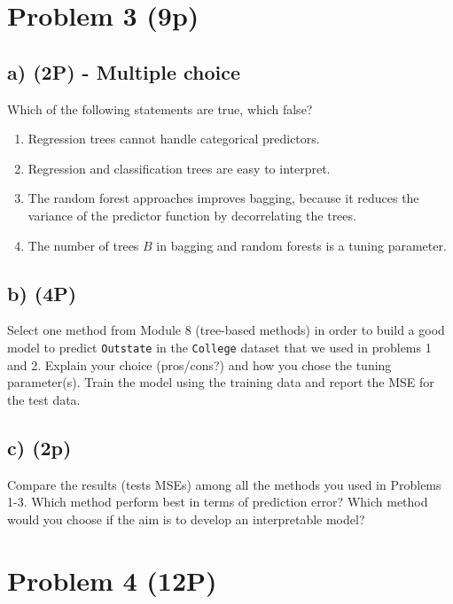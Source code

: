 \documentclass[]{article}
\providecommand{\tightlist}{%
  \setlength{\itemsep}{0pt}\setlength{\parskip}{0pt}}
\begin{document}
\hypertarget{problem-3-9p}{%
\section{Problem 3 (9p)}\label{problem-3-9p}}

\hypertarget{a-2p---multiple-choice-1}{%
\subsection{a) (2P) - Multiple choice}\label{a-2p---multiple-choice-1}}

Which of the following statements are true, which false?

\begin{enumerate}
\def\labelenumi{(\roman{enumi})}
\tightlist
\item
  Regression trees cannot handle categorical predictors.
\item
  Regression and classification trees are easy to interpret.
\item
  The random forest approaches improves bagging, because it reduces the
  variance of the predictor function by decorrelating the trees.
\item
  The number of trees \(B\) in bagging and random forests is a tuning
  parameter.
\end{enumerate}

\hypertarget{b-4p}{%
\subsection{b) (4P)}\label{b-4p}}

Select one method from Module 8 (tree-based methods) in order to build a
good model to predict \texttt{Outstate} in the \texttt{College} dataset
that we used in problems 1 and 2. Explain your choice (pros/cons?) and
how you chose the tuning parameter(s). Train the model using the
training data and report the MSE for the test data.

\hypertarget{c-2p-1}{%
\subsection{c) (2p)}\label{c-2p-1}}

Compare the results (tests MSEs) among all the methods you used in
Problems 1-3. Which method perform best in terms of prediction error?
Which method would you choose if the aim is to develop an interpretable
model?

\hypertarget{problem-4-12p}{%
\section{Problem 4 (12P)}\label{problem-4-12p}}
\end{document}
